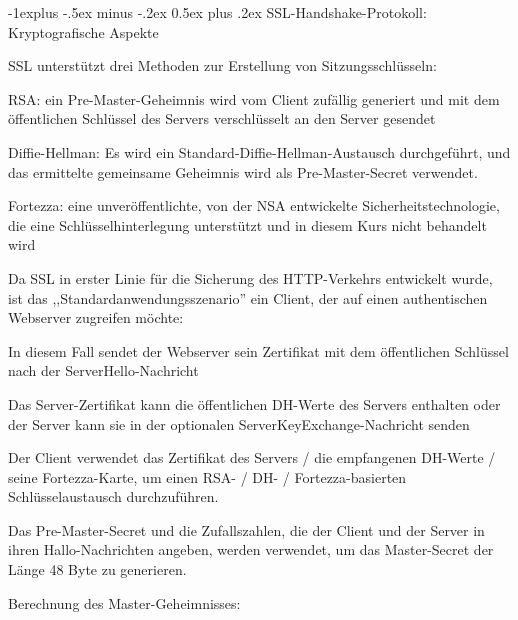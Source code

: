 \documentclass[a4paper]{article}
\makeatletter
\renewcommand{\subsection}{\@startsection{subsection}{2}{0mm}%
 {-1explus -.5ex minus -.2ex}%
 {0.5ex plus .2ex}%
 {\normalfont\normalsize\bfseries}}
\makeatother
\begin{document}
\begin{multicols}{3}
      \subsection{SSL-Handshake-Protokoll: Kryptografische Aspekte}
      \begin{itemize*}
            \item SSL unterstützt drei Methoden zur Erstellung von Sitzungsschlüsseln:
            \begin{itemize*}
                  \item RSA: ein Pre-Master-Geheimnis wird vom Client zufällig generiert und mit dem öffentlichen Schlüssel des Servers verschlüsselt an den Server gesendet
                  \item Diffie-Hellman: Es wird ein Standard-Diffie-Hellman-Austausch durchgeführt, und das ermittelte gemeinsame Geheimnis wird als Pre-Master-Secret verwendet.
                  \item Fortezza: eine unveröffentlichte, von der NSA entwickelte Sicherheitstechnologie, die eine Schlüsselhinterlegung unterstützt und in diesem Kurs nicht behandelt wird
            \end{itemize*}
            \item Da SSL in erster Linie für die Sicherung des HTTP-Verkehrs entwickelt wurde, ist das ,,Standardanwendungsszenario'' ein Client, der auf einen authentischen Webserver zugreifen möchte:
            \begin{itemize*}
                  \item In diesem Fall sendet der Webserver sein Zertifikat mit dem öffentlichen Schlüssel nach der ServerHello-Nachricht
                  \item Das Server-Zertifikat kann die öffentlichen DH-Werte des Servers enthalten oder der Server kann sie in der optionalen ServerKeyExchange-Nachricht senden
                  \item Der Client verwendet das Zertifikat des Servers / die empfangenen DH-Werte / seine Fortezza-Karte, um einen RSA- / DH- / Fortezza-basierten Schlüsselaustausch durchzuführen.
            \end{itemize*}
            \item Das Pre-Master-Secret und die Zufallszahlen, die der Client und der Server in ihren Hallo-Nachrichten angeben, werden verwendet, um das Master-Secret der Länge 48 Byte zu generieren.
            \item Berechnung des Master-Geheimnisses:
            \begin{itemize*}

\end{itemize*}
\end{itemize*}
\end{multicols}
\end{document}
